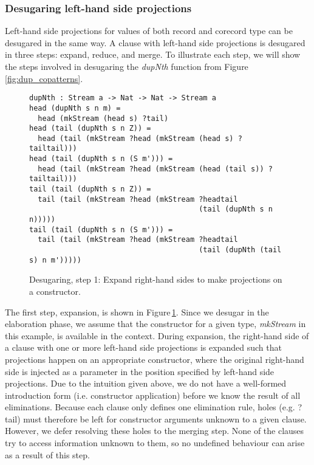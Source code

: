 \subsubsection{Desugaring left-hand side projections}
Left-hand side projections for values of both record and corecord type can be desugared in the same way. A clause with left-hand side projections is desugared in three steps: expand, reduce, and merge. To illustrate each step, we will show the steps involved in desugaring the \textit{dupNth} function from Figure\,\ref{fig:dup_copatterns}. 
\begin{figure}
\begin{lstlisting}[mathescape]
dupNth : Stream a -> Nat -> Nat -> Stream a
head (dupNth s n m) = 
  head (mkStream (head s) ?tail) 
head (tail (dupNth s n Z)) = 
  head (tail (mkStream ?head (mkStream (head s) ?tailtail)))
head (tail (dupNth s n (S m'))) = 
  head (tail (mkStream ?head (mkStream (head (tail s)) ?tailtail)))
tail (tail (dupNth s n Z)) = 
  tail (tail (mkStream ?head (mkStream ?headtail 
                                       (tail (dupNth s n n)))))
tail (tail (dupNth s n (S m'))) = 
  tail (tail (mkStream ?head (mkStream ?headtail 
                                       (tail (dupNth (tail s) n m')))))
\end{lstlisting}
\caption{Desugaring, step 1: Expand right-hand sides to make projections on a constructor.}
\label{fig:desugar_step1}
\end{figure}

The first step, expansion, is shown in Figure\,\ref{fig:desugar_step1}. Since we desugar in the elaboration phase, we assume that the constructor for a given type,  \textit{mkStream} in this example, is available in the context. During expansion, the right-hand side of a clause with one or more left-hand side projections is expanded such that projections happen on an appropriate constructor, where the original right-hand side is injected as a parameter in the position specified by left-hand side projections. Due to the intuition given above, we do not have a well-formed introduction form (i.e. constructor application) before we know the result of all eliminations. Because each clause only defines one elimination rule, holes (e.g. ?tail) must therefore be left for constructor arguments unknown to a given clause. However, we defer resolving these holes to the merging step. None of the clauses try to access information unknown to them, so no undefined behaviour can arise as a result of this step.

